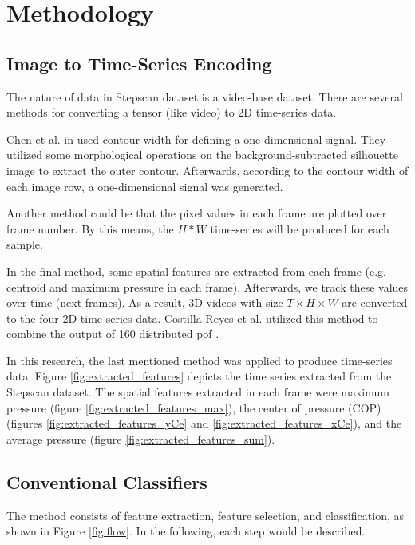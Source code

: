 
\section{Methodology}
\subsection{Image to Time-Series Encoding}
The nature of data in Stepscan dataset is a video-base dataset. There are several methods for converting a tensor (like video) to 2D time-series data. 

Chen et al. in \cite{Chen2006GaitModel} used contour width for defining a one-dimensional signal. They utilized some morphological operations on the background-subtracted silhouette image to extract the outer contour. Afterwards, according to the contour width of each image row, a one-dimensional signal was generated.

Another method could be that the pixel values in each frame are plotted over frame number. By this means, the $H * W$ time-series will be produced for each sample.

In the final method, some spatial features are extracted from each frame (e.g. centroid and maximum pressure in each frame). Afterwards, we track these values over time (next frames). As a result, 3D videos with size $T \times H \times W$ are converted to the four 2D time-series data. Costilla-Reyes et al. utilized this method to combine the output of 160 distributed \acrshort{pof} \cite{Costilla-Reyes2018DeepSensors}.

In this research, the last mentioned method was applied to produce time-series data. Figure \ref{fig:extracted_features} depicts the time series extracted from the Stepscan dataset. The spatial features extracted in each frame were maximum pressure (figure \ref{fig:extracted_features_max}), the center of pressure (COP) (figures \ref{fig:extracted_features_yCe} and \ref{fig:extracted_features_xCe}), and the average pressure (figure \ref{fig:extracted_features_sum}). 



\subsection{Conventional Classifiers}


The method consists of feature extraction, feature selection, and classification, as shown in Figure \ref{fig:flow}. In the following, each step would be described. 
 


